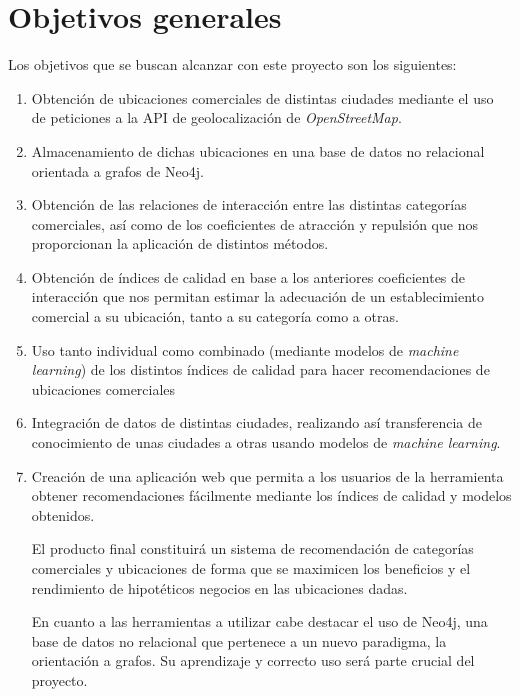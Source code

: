 \section{Objetivos generales}

Los objetivos que se buscan alcanzar con este proyecto son los siguientes:

\begin{enumerate}
	\item Obtención de ubicaciones comerciales de distintas ciudades mediante el uso de peticiones a la API de geolocalización de \textit{OpenStreetMap}.
	
	\item Almacenamiento de dichas ubicaciones en una base de datos no relacional orientada a grafos de Neo4j.
	
	\item Obtención de las relaciones de interacción entre las distintas categorías comerciales, así como de los coeficientes de atracción y repulsión que nos proporcionan la aplicación de distintos métodos.
	
	\item Obtención de índices de calidad en base a los anteriores coeficientes de interacción que nos permitan estimar la adecuación de un establecimiento comercial a
	su ubicación, tanto a su categoría como a otras.
	
	\item Uso tanto individual como combinado (mediante modelos de \textit{machine learning}) de los distintos índices de calidad para hacer recomendaciones de ubicaciones comerciales
	
	\item Integración de datos de distintas ciudades, realizando así transferencia de conocimiento de unas ciudades a otras usando modelos de \textit{machine learning}.
	
	\item Creación de una aplicación web que permita a los usuarios de la herramienta obtener recomendaciones fácilmente mediante los índices de calidad y modelos obtenidos.
	
	El producto final constituirá un sistema de recomendación de categorías comerciales y ubicaciones de forma que se maximicen los beneficios y el rendimiento de hipotéticos negocios en las ubicaciones dadas.
	
	En cuanto a las herramientas a utilizar cabe destacar el uso de Neo4j, una base de datos no relacional que pertenece a un nuevo paradigma, la orientación a grafos. Su aprendizaje y correcto uso será parte crucial del proyecto.
\end{enumerate}

